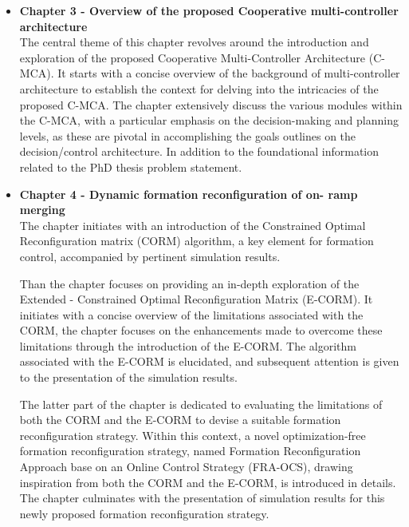 \begin{itemize}
    \item \textbf{Chapter 3 - Overview of the proposed Cooperative multi-controller architecture}\\
     The central theme of this chapter revolves around the introduction and exploration of the proposed Cooperative Multi-Controller Architecture (C-MCA). It starts with a concise overview of the background of multi-controller architecture to establish the context for delving into the intricacies of the proposed C-MCA. The chapter extensively discuss the various modules within the C-MCA, with a particular emphasis on the decision-making and planning levels, as these are pivotal in accomplishing the goals outlines on the decision/control architecture. In addition to the foundational information related to the PhD thesis problem statement. 










    \item \textbf{Chapter 4 - Dynamic formation reconfiguration of on- 
     ramp merging }\\
     The chapter initiates with an introduction of the Constrained Optimal Reconfiguration matrix (CORM) algorithm, a key element for formation control, accompanied by pertinent simulation results. 
    
     Than the chapter focuses on  providing an in-depth exploration of the Extended - Constrained Optimal Reconfiguration Matrix (E-CORM). It initiates with a concise overview of the limitations associated with the CORM, the chapter focuses on the enhancements made to overcome these limitations through the introduction of the E-CORM. The algorithm associated with the E-CORM is elucidated, and subsequent attention is given to the presentation of the simulation results. 

     The latter part of the chapter is dedicated to evaluating the limitations of both the CORM and the E-CORM to devise a suitable formation reconfiguration strategy. Within this context, a novel optimization-free formation reconfiguration strategy, named Formation Reconfiguration Approach base on an Online Control Strategy (FRA-OCS), drawing inspiration from both the CORM and the E-CORM, is introduced in details. The chapter culminates with the presentation of simulation results for this newly proposed formation reconfiguration strategy. 










\end{itemize}
